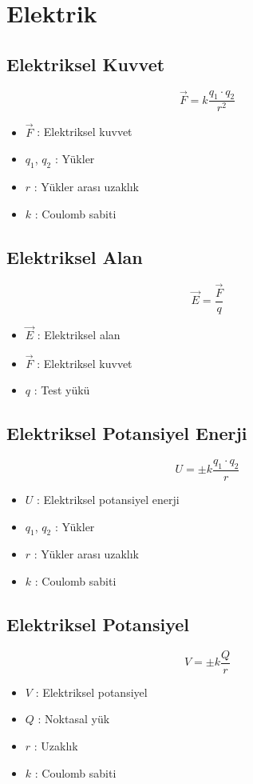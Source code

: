 \documentclass[a4paper, 11pt, titlepage]{article}
\begin{document}
\section{Elektrik}
\subsection{Elektriksel Kuvvet}
\[
\vec{F} = k \frac{q_1 \cdot q_2}{r^2}
\]
\begin{itemize}
  \item $\vec{F}$ : Elektriksel kuvvet
  \item $q_1$, $q_2$ : Yükler
  \item $r$ : Yükler arası uzaklık
  \item $k$ : Coulomb sabiti
\end{itemize}

\subsection{Elektriksel Alan}
\[
\vec{E} = \frac{\vec{F}}{q}
\]
\begin{itemize}
  \item $\vec{E}$ : Elektriksel alan
  \item $\vec{F}$ : Elektriksel kuvvet
  \item $q$ : Test yükü
\end{itemize}

\subsection{Elektriksel Potansiyel Enerji}
\[
U = \pm k \frac{q_1 \cdot q_2}{r}
\]
\begin{itemize}
  \item $U$ : Elektriksel potansiyel enerji
  \item $q_1$, $q_2$ : Yükler
  \item $r$ : Yükler arası uzaklık
  \item $k$ : Coulomb sabiti
\end{itemize}

\subsection{Elektriksel Potansiyel}
\[
V = \pm k \frac{Q}{r}
\]
\begin{itemize}
  \item $V$ : Elektriksel potansiyel
  \item $Q$ : Noktasal yük
  \item $r$ : Uzaklık
  \item $k$ : Coulomb sabiti
\end{itemize}
\end{document}
